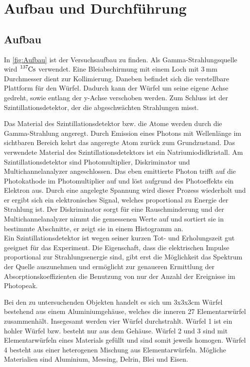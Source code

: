 \section{Aufbau und Durchführung}
\label{sec:Durchführung}

\subsection{Aufbau}
In \autoref{fig:Aufbau} ist der Versuchsaufbau zu finden.
Als Gamma-Strahlungsquelle wird $\ce{^{137}Cs}$ verwendet.
Eine Bleiabschirmung mit einem Loch mit $\SI{3}{\milli\metre}$ Durchmesser dient zur Kollimierung.
Daneben befindet sich die verstellbare Plattform für den Würfel.
Dadurch kann der Würfel um seine eigene Achse gedreht, sowie entlang der y-Achse verschoben werden.
Zum Schluss ist der Szintillationsdetektor, der die abgeschwächten Strahlungen misst.

\noindent
Das Material des Szintillationsdetektor bzw. die Atome werden durch die Gamma-Strahlung angeregt.
Durch Emission eines Photons mit Wellenlänge im sichtbaren Bereich kehrt das angeregte Atom zurück zum Grundzustand.
Das verwendete Material des Szintillationsdetektors ist ein Natriumiodidkristall.
Am Szintillationsdetektor sind Photomultiplier, Diskriminator und Multichannelanalyzer angeschlossen.
Das eben emittierte Photon trifft auf die Photokathode im Photomultiplier auf und löst aufgrund des Photoeffekts ein Elektron aus.
Durch eine angelegte Spannung wird dieser Prozess wiederholt und er ergibt sich ein elektronisches Signal, welches proportional zu Energie der Strahlung ist.
Der Diskriminator sorgt für eine Rauschminderung und der Multichannelanalyzer nimmt die gemessenen Werte auf und sortiert sie in bestimmte Abschnitte, er zeigt sie in einem Histogramm an.\\
Ein Szintillationsdetektor ist wegen seiner kurzen Tot- und Erholungszeit gut geeignet für das Experiment. 
Die Eigenschaft, dass die elektrischen Impulse proportional zur Strahlungsenergie sind, gibt erst die Möglichkeit das Spektrum der Quelle auszunehmen
und ermöglicht zur genaueren Ermittlung der Absorptionskoeffizienten die Benutzung von nur der Anzahl der Ereignisse im Photopeak. 

\noindent
Bei den zu untersuchenden Objekten handelt es sich um 3x3x3cm Würfel bestehend aus einem Aluminiumgehäuse, welches die inneren 27 Elementarwürfel zusammenhält.
Insegesamt werden vier Würfel durchstrahlt.
Würfel 1 ist ein hohler Würfel bzw. besteht nur aus dem Gehäuse.
Würfel 2 und 3 sind mit Elementarwürfeln eines Materials gefüllt und sind somit jeweils homogen.
Würfel 4 besteht aus einer heterogenen Mischung aus Elementarwürfeln.
Mögliche Materialien sind Aluminium, Messing, Delrin, Blei und Eisen.


